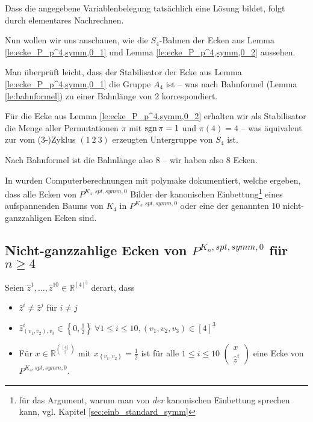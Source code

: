 \documentclass[10p,a4paper,BCOR = 12mm, DIV=15]{scrbook}
\begin{document}
{\begin{bew}
Dass die angegebene Variablenbelegung tatsächlich eine Lösung bildet, folgt durch elementares Nachrechnen.
\end{bew}

Nun wollen wir uns anschauen, wie die $S_4$-Bahnen der Ecken aus Lemma \ref{le:ecke_P_p^4,symm,0_1} und Lemma \ref{le:ecke_P_p^4,symm,0_2} aussehen.

Man überprüft leicht, dass der Stabilisator der Ecke aus Lemma \ref{le:ecke_P_p^4,symm,0_1} die Gruppe $A_4$ ist -- was nach Bahnformel (Lemma \ref{le:bahnformel}) zu einer Bahnlänge von 2 korrespondiert.

Für die Ecke aus Lemma \ref{le:ecke_P_p^4,symm,0_2} erhalten wir als Stabilisator die Menge aller Permutationen $\pi$ mit $\operatorname{sgn} \pi = 1$ und $\pi(4)=4$ -- was äquivalent zur vom (3-)Zyklus $\left(1\ 2\ 3\right)$ erzeugten Untergruppe von $S_4$ ist.

Nach Bahnformel ist die Bahnlänge also 8 -- wir haben also 8 Ecken.

In \citep{sorgatz2011} wurden Computerberechnungen mit polymake \cite{polymake} dokumentiert, welche ergeben, dass alle Ecken von $P^{K_4, spt, symm, 0}$ Bilder der kanonischen Einbettung\footnote{für das Argument, warum man von \emph{der} kanonischen Einbettung sprechen kann, vgl. Kapitel \ref{sec:einb_standard_symm}} eines aufspannenden Baums von $K_4$ in $P^{K_4, spt, symm, 0}$ oder eine der genannten 10 nicht-ganzzahligen Ecken sind.

\subsection{Nicht-ganzzahlige Ecken von $P^{K_n, spt, symm, 0}$ für $n\geq 4$}

\begin{Def}
\label{def:nichtganzz_ecken}
Seien $\widehat{z}^1, \ldots, \widehat{z}^{10}\in \mathbb{R}^{[4]^{\underline{3}}}$ derart, dass
\begin{itemize}
\item $\widehat{z}^i \neq \widehat{z}^j$ für $i\neq j$
\item $\widehat{z}^i_{\left(v_1, v_2\right), v_3} \in \left\{0, \frac{1}{2}\right\}\ \forall 1 \leq i \leq 10, \left(v_1, v_2, v_3\right) \in [4]^{\underline{3}}$
\item Für $x\in \mathbb{R}^{[4]\choose 2}$ mit $x_{\left\{v_1, v_2\right\}} = \frac{1}{2}$ ist für alle $1\leq i \leq 10$ $\left(
\begin{array}{c}
x \\
\widehat{z}^i
\end{array}
\right)$ eine Ecke von $P^{K_4, spt, symm, 0}$.
\end{itemize}
\end{Def}

}
\end{document}
